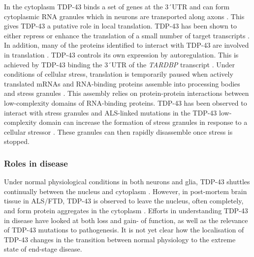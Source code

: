 In the cytoplasm TDP-43 binds a set of genes at the 3\'\ UTR \citep{Colombrita2012} and can form cytoplasmic RNA granules which in neurons are transported along axons \citep{Alami2013, Fallini2012}. 
This gives TDP-43 a putative role in local translation.
TDP-43 has been shown to either repress or enhance the translation of a small number of target transcripts \citep{Majumder2012, Majumder2016, Neelagandan2018}.
In addition, many of the proteins identified to interact with TDP-43 are involved in translation \citep{Freibaum2010-hw}.
TDP-43 controls its own expression by autoregulation.
This is achieved by TDP-43 binding the 3\'\ UTR of the \textit{TARDBP} transcript \citep{Ayala2011,Koyama2016}. 
Under conditions of cellular stress, translation is temporarily paused when actively translated mRNAs and RNA-binding proteins assemble into processing bodies and stress granules \citep{Anderson2008}. 
This assembly relies on protein-protein interactions between low-complexity domains of RNA-binding proteins.
TDP-43 has been observed to interact with stress granules \citep{Colombrita2009} and ALS-linked mutations in the TDP-43 low-complexity domain can increase the formation of stress granules in response to a cellular stressor \citep{Liu-Yesucevitz2010}.
These granules can then rapidly disassemble once stress is stopped.


\subsubsection{Roles in disease}

Under normal physiological conditions in both neurons and glia, TDP-43 shuttles continually between the nucleus and cytoplasm \citep{Ayala2008}.
However, in post-mortem brain tissue in ALS/FTD, TDP-43 is observed to leave the nucleus, often completely, and form protein aggregates in the cytoplasm \citep{Neumann2006}.
Efforts in understanding TDP-43 in disease have looked at both loss and gain- of function, as well as the relevance of TDP-43 mutations to pathogenesis.
It is not yet clear how the localisation of TDP-43 changes in the transition between normal physiology to the extreme state of end-stage disease.

